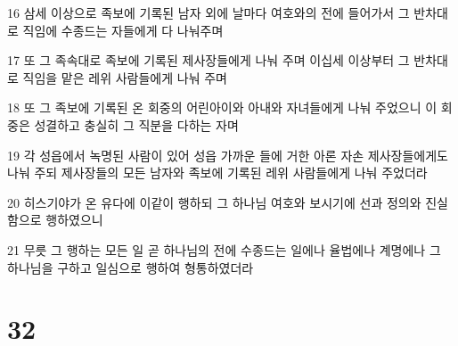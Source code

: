 \par 16 삼세 이상으로 족보에 기록된 남자 외에 날마다 여호와의 전에 들어가서 그 반차대로 직임에 수종드는 자들에게 다 나눠주며
\par 17 또 그 족속대로 족보에 기록된 제사장들에게 나눠 주며 이십세 이상부터 그 반차대로 직임을 맡은 레위 사람들에게 나눠 주며
\par 18 또 그 족보에 기록된 온 회중의 어린아이와 아내와 자녀들에게 나눠 주었으니 이 회중은 성결하고 충실히 그 직분을 다하는 자며
\par 19 각 성읍에서 녹명된 사람이 있어 성읍 가까운 들에 거한 아론 자손 제사장들에게도 나눠 주되 제사장들의 모든 남자와 족보에 기록된 레위 사람들에게 나눠 주었더라
\par 20 히스기야가 온 유다에 이같이 행하되 그 하나님 여호와 보시기에 선과 정의와 진실함으로 행하였으니
\par 21 무릇 그 행하는 모든 일 곧 하나님의 전에 수종드는 일에나 율법에나 계명에나 그 하나님을 구하고 일심으로 행하여 형통하였더라

\chapter{32}

